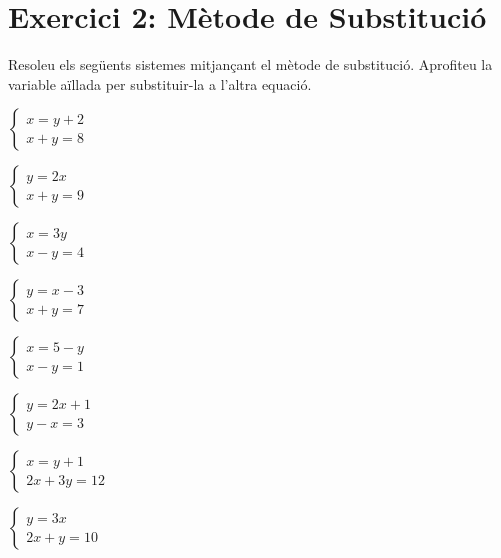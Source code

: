 \documentclass[12pt,a4paper]{article}
\begin{document}
\newpage

\section*{Exercici 2: Mètode de Substitució}
Resoleu els següents sistemes mitjançant el mètode de substitució.
Aprofiteu la variable aïllada per substituir-la a l'altra equació.

\begin{enumerate}[label=\alph*), itemsep=1.2cm]
    \begin{minipage}[t]{0.45\textwidth}
    \item $\begin{cases} x = y + 2 \\ x + y = 8 \end{cases}$
    \item $\begin{cases} y = 2x \\ x + y = 9 \end{cases}$
    \item $\begin{cases} x = 3y \\ x - y = 4 \end{cases}$
    \item $\begin{cases} y = x - 3 \\ x + y = 7 \end{cases}$
    \item $\begin{cases} x = 5 - y \\ x - y = 1 \end{cases}$
    \item $\begin{cases} y = 2x + 1 \\ y - x = 3 \end{cases}$
    \end{minipage}
    \begin{minipage}[t]{0.45\textwidth}
    \item $\begin{cases} x = y + 1 \\ 2x + 3y = 12 \end{cases}$
    \item $\begin{cases} y = 3x \\ 2x + y = 10 \end{cases}$

\end{minipage}
\end{enumerate}
\end{document}
